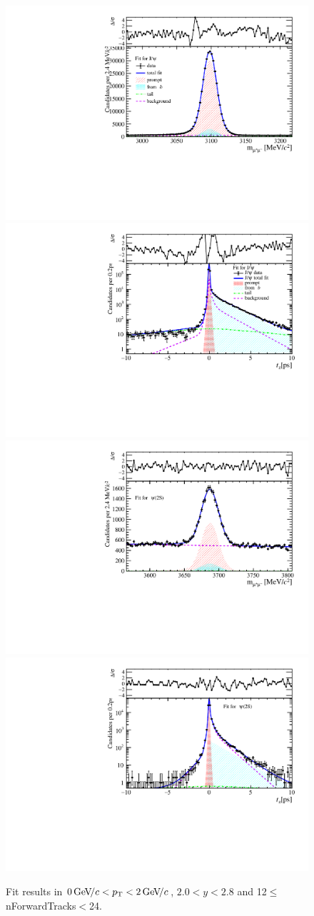 \begin{figure}[H]
\begin{center}
\includegraphics[width=0.47\linewidth]{pdf/Jpsi/drawmassF/n2y1pt1.pdf}
\includegraphics[width=0.47\linewidth]{pdf/Jpsi/2DFitF/n2y1pt1.pdf}
\vspace*{-0.5cm}
\includegraphics[width=0.47\linewidth]{pdf/Psi2S/drawmassF/n2y1pt1.pdf}
\includegraphics[width=0.47\linewidth]{pdf/Psi2S/2DFitF/n2y1pt1.pdf}
\vspace*{-0.5cm}
\end{center}
\caption{Fit results in $0\text{\,Ge\kern -0.1em V\!/}c<p_{\mathrm{T}}<2\text{\,Ge\kern -0.1em V\!/}c$, $2.0<y<2.8$ and 12$\leq$nForwardTracks$<$24.}
\label{Fitn2y1pt1}
\end{figure}

